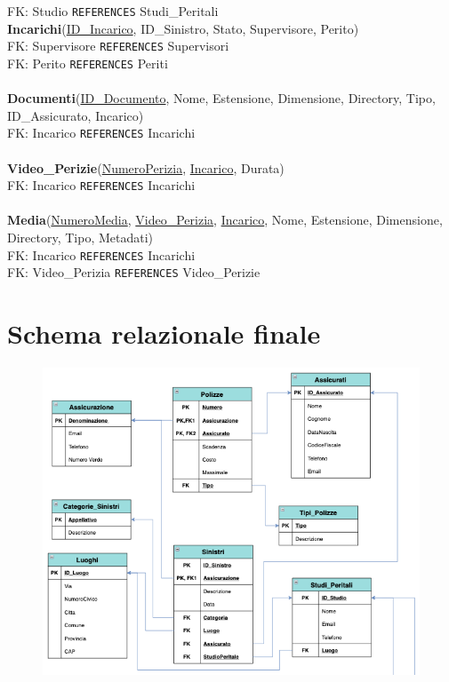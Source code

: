 \documentclass[a4paper,12pt]{report}
\begin{document}
FK: Studio \texttt{REFERENCES} Studi\_Peritali \\
\clearpage
\noindent
\textbf{Incarichi}(\underline{ID\_Incarico}, ID\_Sinistro, Stato, Supervisore, Perito) \\
FK: Supervisore \texttt{REFERENCES} Supervisori \\
FK: Perito \texttt{REFERENCES} Periti \\
\\
\textbf{Documenti}(\underline{ID\_Documento}, Nome, Estensione, Dimensione, Directory, Tipo, ID\_Assicurato, Incarico) \\
FK: Incarico \texttt{REFERENCES} Incarichi \\
\\
\textbf{Video\_Perizie}(\underline{NumeroPerizia}, \underline{Incarico}, Durata) \\
FK: Incarico \texttt{REFERENCES} Incarichi \\
\\
\textbf{Media}(\underline{NumeroMedia}, \underline{Video\_Perizia}, \underline{Incarico}, Nome, Estensione, Dimensione, Directory, Tipo, Metadati) \\
FK: Incarico \texttt{REFERENCES} Incarichi \\
FK: Video\_Perizia \texttt{REFERENCES} Video\_Perizie \\

\clearpage
\section{Schema relazionale finale}

\begin{figure}[ht]
    \begin{center}
        \centering
        \includegraphics[width=\textwidth]{img/Relazionale1.png}
    \end{center}
\end{figure}
\end{document}
